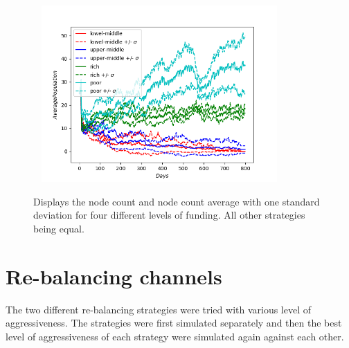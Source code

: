 \begin{figure}[!htb]
	\hspace*{-0.7cm}\
	\centering
	\includegraphics[width=9cm]{images/histories_deviation_fund.png}
	\caption{ Displays the node count and node count average with one standard deviation for four different levels of funding. All other strategies being equal.
	}
	\label{fig:funding}
	\hspace*{2mm} 
\end{figure}

\section{Re-balancing channels}

The two different re-balancing  strategies were tried with various level of aggressiveness. The strategies were first simulated separately and then the best level of aggressiveness of each strategy were simulated again against each other.

